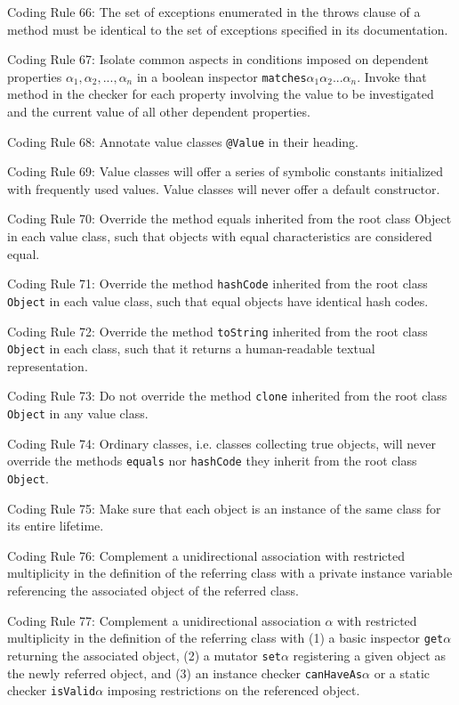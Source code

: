 \documentclass{article}
\begin{document}
\par Coding Rule 66: The set of exceptions enumerated in the throws clause of a method must be identical to the set of exceptions specified in its documentation.
\par Coding Rule 67: Isolate common aspects in conditions imposed on dependent properties $\alpha_1,\alpha_2,...,\alpha_n$ in a boolean inspector \texttt{matches}$\alpha_1\alpha_2...\alpha_n$. Invoke that method in the checker for each property involving the value to be investigated and the current value  of all other dependent properties.
\par Coding Rule 68: Annotate value classes \texttt{@Value} in their heading.
\par Coding Rule 69: Value classes will offer a series of symbolic constants initialized with frequently used values. Value classes will never offer a default constructor.
\par Coding Rule 70: Override the method equals inherited from the root class Object in  each value class, such that objects with equal characteristics are considered equal.
\par Coding Rule 71: Override the method \texttt{hashCode} inherited from the root class \texttt{Object} in each value class, such that equal objects have identical hash codes.
\par Coding Rule 72: Override the method \texttt{toString} inherited from the root class \texttt{Object} in  each class, such that it returns a human-readable textual representation.
\par Coding Rule 73: Do not override the method \texttt{clone} inherited from the root class \texttt{Object} in any value class.
\par Coding Rule 74: Ordinary classes, i.e. classes collecting true objects, will never override the methods \texttt{equals} nor \texttt{hashCode} they inherit from the root class \texttt{Object}.
\par Coding Rule 75: Make sure that each object is an instance of the same class for its entire lifetime.
\par Coding Rule 76: Complement a unidirectional association with restricted multiplicity in the definition of the referring class with a private instance variable referencing the  associated object of the referred class. 
\par Coding Rule 77: Complement a unidirectional association $\alpha$ with restricted multiplicity in the definition of the referring class with (1) a basic inspector \texttt{get}$\alpha$ returning the associated object, (2) a mutator \texttt{set}$\alpha$ registering a given object as the newly referred object, and (3) an instance checker \texttt{canHaveAs}$\alpha$ or a static checker \texttt{isValid}$\alpha$ imposing  restrictions on the referenced object.
\end{document}
